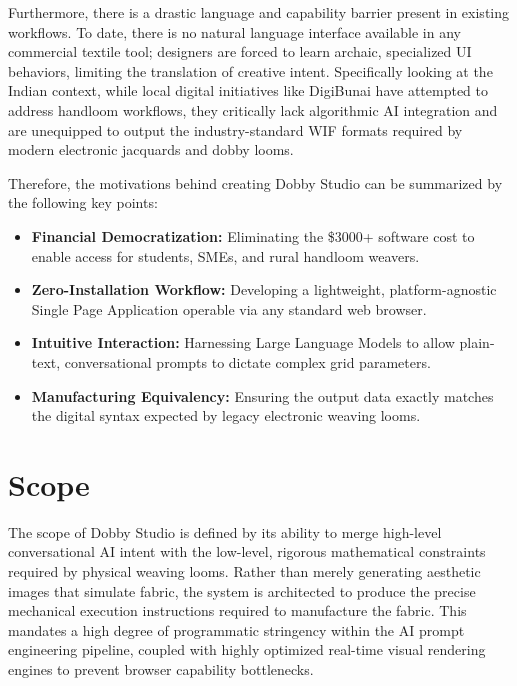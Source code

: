 Furthermore, there is a drastic language and capability barrier present in existing workflows. To date, there is no natural language interface available in any commercial textile tool; designers are forced to learn archaic, specialized UI behaviors, limiting the translation of creative intent. Specifically looking at the Indian context, while local digital initiatives like DigiBunai have attempted to address handloom workflows, they critically lack algorithmic AI integration and are unequipped to output the industry-standard WIF formats required by modern electronic jacquards and dobby looms.

Therefore, the motivations behind creating Dobby Studio can be summarized by the following key points:
\begin{itemize}
    \item \textbf{Financial Democratization:} Eliminating the \$3000+ software cost to enable access for students, SMEs, and rural handloom weavers.
    \item \textbf{Zero-Installation Workflow:} Developing a lightweight, platform-agnostic Single Page Application operable via any standard web browser.
    \item \textbf{Intuitive Interaction:} Harnessing Large Language Models to allow plain-text, conversational prompts to dictate complex grid parameters.
    \item \textbf{Manufacturing Equivalency:} Ensuring the output data exactly matches the digital syntax expected by legacy electronic weaving looms.
\end{itemize}

\section{Scope}
The scope of Dobby Studio is defined by its ability to merge high-level conversational AI intent with the low-level, rigorous mathematical constraints required by physical weaving looms. Rather than merely generating aesthetic images that simulate fabric, the system is architected to produce the precise mechanical execution instructions required to manufacture the fabric. This mandates a high degree of programmatic stringency within the AI prompt engineering pipeline, coupled with highly optimized real-time visual rendering engines to prevent browser capability bottlenecks. 

